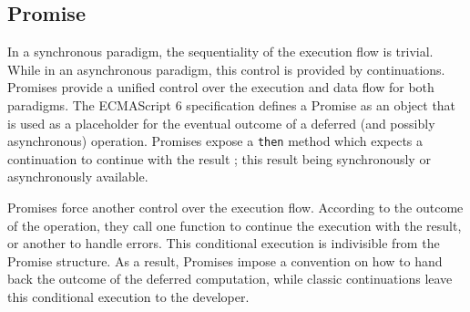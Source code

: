\subsection{Promise} \label{section:definitions:promise}



In a synchronous paradigm, the sequentiality of the execution flow is trivial.
While in an asynchronous paradigm, this control is provided by continuations.
Promises provide a unified control over the execution and data flow for both paradigms.
The ECMAScript 6 specification defines a Promise as an object that is used as a placeholder for the eventual outcome of a deferred (and possibly asynchronous) operation.
Promises expose a \texttt{then} method which expects a continuation to continue with the result ; this result being synchronously or asynchronously available.


Promises force another control over the execution flow.
According to the outcome of the operation, they call one function to continue the execution with the result, or another to handle errors.
This conditional execution is indivisible from the Promise structure.
As a result, Promises impose a convention on how to hand back the outcome of the deferred computation, while classic continuations leave this conditional execution to the developer.

